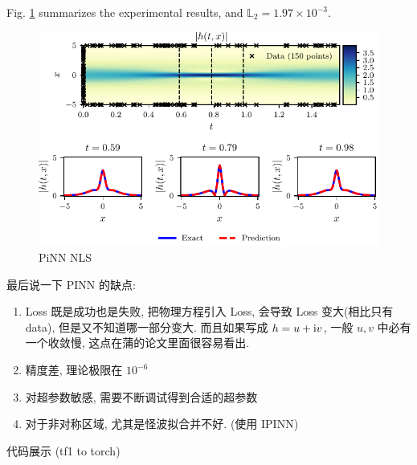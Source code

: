 Fig. \ref{fig:NLS} summarizes the experimental results, and $\mathbb{L}_2 = 1.97 \times 10^{-3}$.
\begin{figure}[ht]
    \centering
    \includegraphics[width=\textwidth]{images/NLS.pdf}
    \caption{PiNN NLS}
    \label{fig:NLS}
\end{figure}

最后说一下 PINN 的缺点: 
\begin{enumerate}
    \item Loss 既是成功也是失败, 把物理方程引入 Loss, 会导致 Loss 变大(相比只有 data), 但是又不知道哪一部分变大. 而且如果写成 $ h = u+ \mathrm{i} v $, 一般 $ u, v $ 中必有一个收敛慢, 这点在蒲的论文里面很容易看出. 
    \item 精度差, 理论极限在 $ 10^{-6} $
    \item 对超参数敏感, 需要不断调试得到合适的超参数
    \item 对于非对称区域, 尤其是怪波拟合并不好. (使用 IPINN)
\end{enumerate}

代码展示 (tf1 to torch)